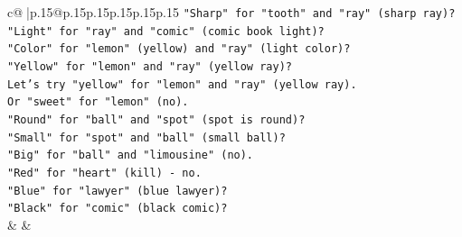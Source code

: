\documentclass{article}
\begin{document}
{\begin{supertabular}{c@{$\;$}|p{.15\linewidth}@{}p{.15\linewidth}p{.15\linewidth}p{.15\linewidth}p{.15\linewidth}p{.15\linewidth}}
{{{\texttt{"Sharp" for "tooth" and "ray" (sharp ray)?} \\
\texttt{"Light" for "ray" and "comic" (comic book light)?} \\
\texttt{"Color" for "lemon" (yellow) and "ray" (light color)?} \\
\texttt{"Yellow" for "lemon" and "ray" (yellow ray)?} \\
\texttt{Let's try "yellow" for "lemon" and "ray" (yellow ray).} \\
\texttt{Or "sweet" for "lemon" (no).} \\
\texttt{"Round" for "ball" and "spot" (spot is round)?} \\
\texttt{"Small" for "spot" and "ball" (small ball)?} \\
\texttt{"Big" for "ball" and "limousine" (no).} \\
\texttt{"Red" for "heart" (kill) {-} no.} \\
\texttt{"Blue" for "lawyer" (blue lawyer)?} \\
\texttt{"Black" for "comic" (black comic)?} \\
            }
        }
    }
    & & \\ \\

\end{supertabular}
}
\end{document}
